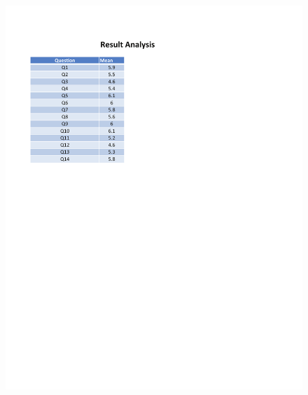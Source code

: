 \begin{appendices}
\begin{figure}[h!t]
    \centering
      \includegraphics[width=6in]{ch5/Result/Mobile/3.pdf}
  \label{fig:Result:Analysis:Mobile}
\end{figure}

\end{appendices}

